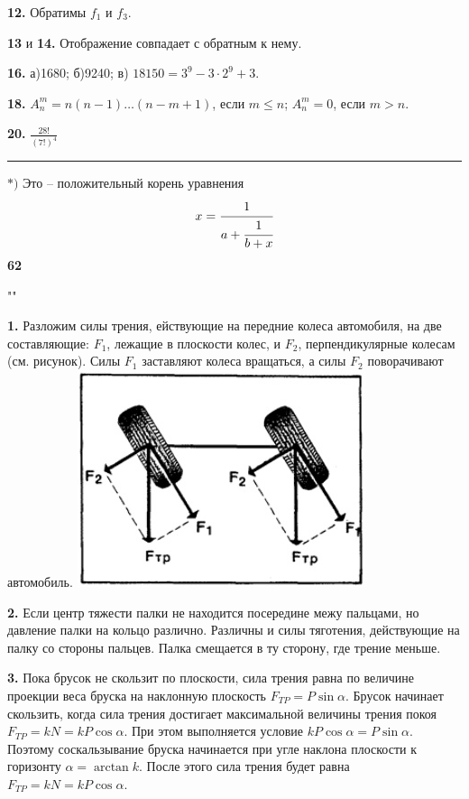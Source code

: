 \begin{minipage}{0.45\textwidth}
\textbf{12.} Обратимы $f_1$ и $f_3$.

\textbf{13} и \textbf{14.} Отображение совпадает с обратным к нему.

\textbf{16.} а)1680; б)9240; в) $18 150 = 3^9 - 3\cdot 2^9 + 3$.

\textbf{18.} $A_n^m = n (n - 1)\ldots (n- m + 1)$, если $m \le n$; $A_n^m = 0$, если $m > n$.

\textbf{20.} $\frac{28!}{(7!)^4}$

\noindent\rule{2cm}{0.4pt}

$*)$ Это -- положительный корень уравнения
\begin{equation}
  x = \cfrac{1}{a 
          + \cfrac{1}{b + x } }
\end{equation}
\textbf{62}
\end{minipage}
\hfill
\begin{minipage}{0.45\textwidth}
\begin{center}

""

\end{center}
\textbf{1.} Разложим силы трения, ействующие на передние колеса автомобиля, на две составляющие: $F_1$, лежащие в плоскости колес, и $F_2$, перпендикулярные колесам (см. рисунок). Силы $F_1$ заставляют колеса вращаться, а силы $F_2$ поворачивают автомобиль.
\includegraphics[scale=1]{lab62.jpg}

\textbf{2.} Если центр тяжести палки не находится посередине межу пальцами, но давление палки на кольцо различно. Различны и силы тяготения, действующие на палку со стороны пальцев. Палка смещается в ту сторону, где трение меньше.

\textbf{3.} Пока брусок не скользит по плоскости, сила трения равна по величине проекции веса бруска на наклонную плоскость $F_{TP} = P\sin \alpha$. Брусок начинает скользить, когда сила трения достигает максимальной величины трения покоя $F_{TP} = k N = k P\cos \alpha$. При этом выполняется условие $k P\cos \alpha = P\sin \alpha$. Поэтому соскальзывание бруска начинается при угле наклона плоскости к горизонту $\alpha = \arctan k$. После этого сила трения будет равна $F_{TP} = k N = k P\cos \alpha$.


\end{minipage}
